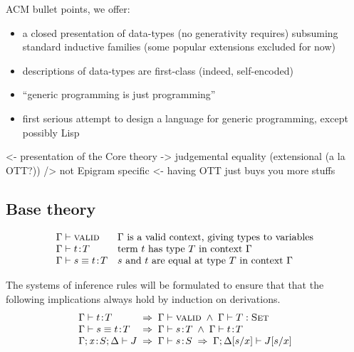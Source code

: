 \documentclass[preprint, authoryear]{sigplanconf}
\newenvironment{structure}{\footnotesize\verbatim}{\endverbatim}
\begin{document}
ACM bullet points, we offer:
\begin{itemize}
\item a closed presentation of data-types (no generativity requires)
  subsuming standard inductive families (some popular extensions
  excluded for now)
\item descriptions of data-types are first-class (indeed,
  self-encoded)
\item ``generic programming is just programming''
\item first serious attempt to design a language for generic
  programming, except possibly Lisp
\end{itemize}

\begin{structure}
<- presentation of the Core theory
    -> judgemental equality (extensional (a la OTT?))
    /> not Epigram specific 
        <- having OTT just buys you more stuffs
\end{structure}


\subsection{Base theory}

\[
\begin{array}{ll}
\Gamma\vdash\textsc{valid} & \mbox{\(\Gamma\) is a valid context, giving types to
                    variables} \\
\Gamma\vdash t\!:\!T & \mbox{term \(t\) has type \(T\) in context \(\Gamma\)} \\
\Gamma\vdash s \equiv t\!:\!T & \mbox{\(s\) and \(t\) are equal at type \(T\)
   in context \(\Gamma\)} \\
\end{array}
\]

The systems of inference rules will be formulated to ensure that that the
following implications always hold by induction on derivations.
\[
\begin{array}{l@{\;\;\Rightarrow\;\;}l}
\Gamma\vdash \Bhab{t}{T}            & \Gamma\vdash\Valid \;\wedge\; \Gamma\vdash\Type{T} \\
\Gamma\vdash s \equiv \Bhab{t}{T}   & \Gamma\vdash \Bhab{s}{T} \;\wedge\; \Gamma\vdash \Bhab{t}{T} \\
\Gamma;\xS;\Delta \vdash J          & \Gamma\vdash \Bhab{s}{S} \;\Rightarrow\; 
                                           \Gamma;\Delta[s/x] \vdash J[s/x] \\
\end{array}
\]
\end{document}
